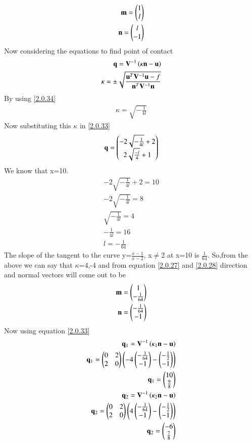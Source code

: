 \documentclass[journal,12pt,twocolumn]{IEEEtran}
\begin{document}
\begin{align}
\mathbf{m}=\begin{pmatrix}1\\l\end{pmatrix}\label{2.0.27}\\
\mathbf{n}=\begin{pmatrix}l\\-1\end{pmatrix}\label{2.0.28}
\end{align}$
$Now considering the equations to find point of contact
\begin{align} \mathbf{q} = \mathbf{V}^{-1}\left(\kappa \mathbf{n}-\mathbf{u}\right)\label{2.0.33}
\\
\kappa = \pm \sqrt{\frac{\mathbf{u}^T\mathbf{V}^{-1}\mathbf{u}-f}{\mathbf{n}^T\mathbf{V}^{-1}\mathbf{n}}} \label{2.0.34}
\end{align}$
$By using \eqref{2.0.34}
\begin{align}
\kappa=\sqrt{-\frac{1}{4l}}
\end{align}
Now substituting this $\kappa$ in \eqref{2.0.33}
\begin{align}
\mathbf{q}=\begin{pmatrix}-2\sqrt{-\frac{1}{4l}}+2\\2\sqrt{\frac{-l}{4}}+1\end{pmatrix}
\end{align}
We know that x=10.
\begin{align}
-2\sqrt{-\frac{1}{4l}}+2=10\\
-2\sqrt{-\frac{1}{4l}}=8\\
\sqrt{-\frac{1}{4l}}=4\\
-\frac{1}{4l}=16\\
l=-\frac{1}{64}
\end{align}$
$The slope of the tangent to the curve y=$\frac{x-1}{x-2}$, x$\not=$2 at x=10 is $\frac{1}{64}$.
So,from the above we can say that $\kappa$=4,-4 and from equation \eqref{2.0.27} and \eqref{2.0.28} direction and normal vectors will come out to be
\begin{align}
\mathbf{m}=\begin{pmatrix}1\\-\frac{1}{64}\end{pmatrix}\\
\mathbf{n}=\begin{pmatrix}-\frac{1}{64}\\-1\end{pmatrix}
\end{align}
Now using equation \eqref{2.0.33}
\begin{align}
\mathbf{q}_1 = \mathbf{V}^{-1}\left(\kappa_1 \mathbf{n}-\mathbf{u}\right)\\
\mathbf{q}_1 = \begin{pmatrix}0&2\\2&0\end{pmatrix}\left(-4 \begin{pmatrix}-\frac{1}{64}\\-1\end{pmatrix}-\begin{pmatrix}-\frac{1}{2}\\-1\end{pmatrix}\right)\\
\mathbf{q}_1=\begin{pmatrix}10\\ \frac{9}{8}\end{pmatrix}\\
\mathbf{q}_2 = \mathbf{V}^{-1}\left(\kappa_2 \mathbf{n}-\mathbf{u}\right)\\
\mathbf{q}_2 = \begin{pmatrix}0&2\\2&0\end{pmatrix}\left(4 \begin{pmatrix}-\frac{1}{64}\\-1\end{pmatrix}-\begin{pmatrix}-\frac{1}{2}\\-1\end{pmatrix}\right)\\
\mathbf{q}_2=\begin{pmatrix}-6\\ \frac{7}{8}\end{pmatrix}
\end{align}
\end{document}
